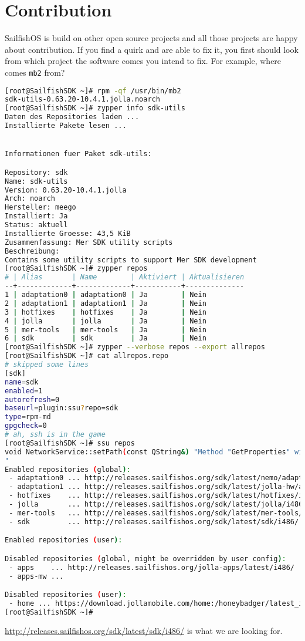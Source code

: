 \section{Contribution}\label{sec:contribution}
%
%
SailfishOS is build on other open source projects and all those projects are happy about contribution. If you find a quirk and are able to fix it, you first should look from which project the software comes you intend to fix.
For example, where comes \verb,mb2, from?

\begin{lstlisting}[language=bash]
[root@SailfishSDK ~]# rpm -qf /usr/bin/mb2
sdk-utils-0.63.20-10.4.1.jolla.noarch
[root@SailfishSDK ~]# zypper info sdk-utils
Daten des Repositories laden ...
Installierte Pakete lesen ...


Informationen fuer Paket sdk-utils:

Repository: sdk
Name: sdk-utils
Version: 0.63.20-10.4.1.jolla
Arch: noarch
Hersteller: meego
Installiert: Ja
Status: aktuell
Installierte Groesse: 43,5 KiB
Zusammenfassung: Mer SDK utility scripts
Beschreibung: 
Contains some utility scripts to support Mer SDK development
[root@SailfishSDK ~]# zypper repos
# | Alias       | Name        | Aktiviert | Aktualisieren
--+-------------+-------------+-----------+--------------
1 | adaptation0 | adaptation0 | Ja        | Nein         
2 | adaptation1 | adaptation1 | Ja        | Nein         
3 | hotfixes    | hotfixes    | Ja        | Nein         
4 | jolla       | jolla       | Ja        | Nein         
5 | mer-tools   | mer-tools   | Ja        | Nein         
6 | sdk         | sdk         | Ja        | Nein 
[root@SailfishSDK ~]# zypper --verbose repos --export allrepos
[root@SailfishSDK ~]# cat allrepos.repo
# skipped some lines
[sdk]
name=sdk
enabled=1
autorefresh=0
baseurl=plugin:ssu?repo=sdk
type=rpm-md
gpgcheck=0
# ah, ssh is in the game
[root@SailfishSDK ~]# ssu repos
void NetworkService::setPath(const QString&) "Method "GetProperties" with signature "" on interface "net.connman.Service" doesn't exist
" 
Enabled repositories (global): 
 - adaptation0 ... http://releases.sailfishos.org/sdk/latest/nemo/adaptation-x86-common/i486/
 - adaptation1 ... http://releases.sailfishos.org/sdk/latest/jolla-hw/adaptation-jolla-x86-emul/i486/
 - hotfixes    ... http://releases.sailfishos.org/sdk/latest/hotfixes/i486/
 - jolla       ... http://releases.sailfishos.org/sdk/latest/jolla/i486/
 - mer-tools   ... http://releases.sailfishos.org/sdk/latest/mer-tools/builds/i486/packages/
 - sdk         ... http://releases.sailfishos.org/sdk/latest/sdk/i486/

Enabled repositories (user): 

Disabled repositories (global, might be overridden by user config): 
 - apps    ... http://releases.sailfishos.org/jolla-apps/latest/i486/
 - apps-mw ... 

Disabled repositories (user): 
 - home ... https://download.jollamobile.com/home:/honeybadger/latest_i486/
[root@SailfishSDK ~]#
\end{lstlisting}
%
\url{http://releases.sailfishos.org/sdk/latest/sdk/i486/} is what we are looking for.
